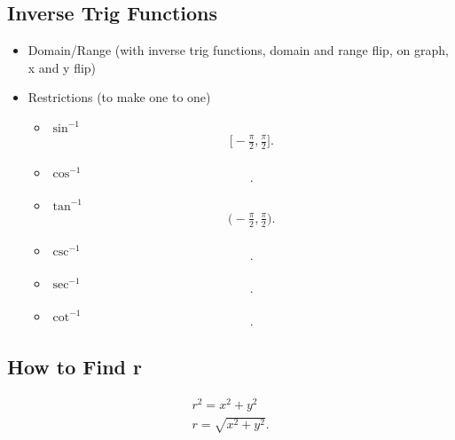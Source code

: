 \documentclass{report}
\begin{document}
      \bigbreak \noindent \bigbreak \noindent 
      \subsection{Inverse Trig Functions}
      \begin{itemize}
        \item Domain/Range (with inverse trig functions, domain and range flip, on graph, x and y flip)
        \item Restrictions (to make one to one)
          \begin{itemize}
            \item $\sin^{-1}{}$
              \begin{align*}
                \bigg[-\frac{\pi}{2}, \frac{\pi}{2}\bigg] 
              .\end{align*}
            \item $\cos^{-1}{}$
              \begin{align*}
                [0,\pi]
              .\end{align*}
            \item $\tan^{-1}{}$
              \begin{align*}
                \bigg(-\frac{\pi}{2}, \frac{\pi}{2}\bigg)
              .\end{align*}
            \item $\csc^{-1}{} $
              \begin{align*}
                [-\frac{\pi}{2}, \frac{\pi}{2}]
              .\end{align*}
            \item $\sec^{-1}{} $
              \begin{align*}
                [0,\pi]
              .\end{align*}
            \item $\cot^{-1}{}$
              \begin{align*}
                [0,\pi]
              .\end{align*}
          \end{itemize}
      \end{itemize}

      \bigbreak \noindent \bigbreak \noindent 
      \subsection{How to Find r}
        \begin{align*}
          r^{2} = x^{2}+y^{2} \\
          r = \sqrt{x^{2}+y^{2}}
        .\end{align*}
\end{document}
